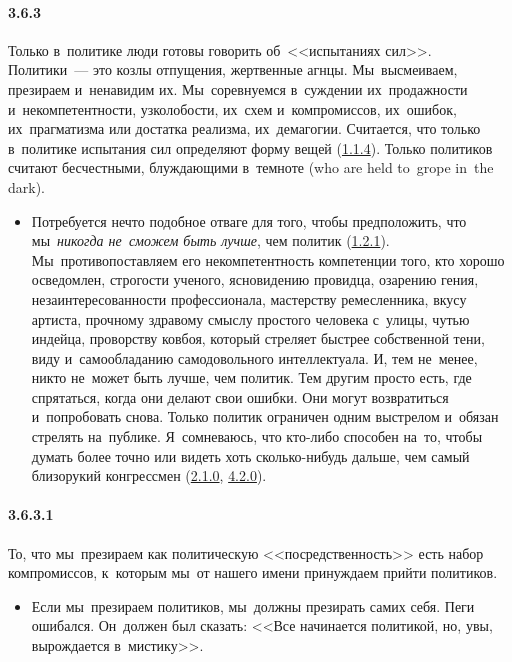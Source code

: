 \paragraph{3.6.3}\hypertarget{par:3.6.3}{} Только в~политике люди готовы говорить об~<<испытаниях сил>>. Политики~--- это козлы отпущения, жертвенные агнцы. Мы~высмеиваем, презираем и~ненавидим их. Мы~соревнуемся в~суждении их~продажности и~некомпетентности, узколобости, их~схем и~компромиссов, их~ошибок, их~прагматизма или достатка реализма, их~демагогии. Считается, что только в~политике испытания сил определяют форму вещей (\hyperlink{par:1.1.4}{1.1.4}). Только политиков считают бесчестными, блуждающими в~темноте (who are held to~grope in~the dark). 
	\begin{itemize}
	\item 
	Потребуется нечто подобное отваге для того, чтобы предположить, что мы~{\itshape никогда не~сможем быть лучше}, чем политик (\hyperlink{par:1.2.1}{1.2.1}). Мы~противопоставляем его некомпетентность компетенции того, кто хорошо осведомлен, строгости ученого, ясновидению провидца, озарению гения, незаинтересованности профессионала, мастерству ремесленника, вкусу артиста, прочному здравому смыслу простого человека с~улицы, чутью индейца, проворству ковбоя, который стреляет быстрее собственной тени, виду и~самообладанию самодовольного интеллектуала. И, тем не~менее, никто не~может быть лучше, чем политик. Тем другим просто есть, где спрятаться, когда они делают свои ошибки. Они могут возвратиться и~попробовать снова. Только политик ограничен одним выстрелом и~обязан стрелять на~публике. Я~сомневаюсь, что кто-либо способен на~то, чтобы думать более точно или видеть хоть сколько-нибудь дальше, чем самый близорукий конгрессмен (\hyperlink{par:2.1.0}{2.1.0}, \hyperlink{par:4.2.0}{4.2.0}).
	\end{itemize}

\paragraph{3.6.3.1}\hypertarget{par:3.6.3.1}{} То, что мы~презираем как политическую <<посредственность>> есть набор компромиссов, к~которым мы~от нашего имени принуждаем прийти политиков.
	\begin{itemize}
	\item 
	Если мы~презираем политиков, мы~должны презирать самих себя. Пеги ошибался. Он~должен был сказать: <<Все начинается политикой, но, увы, вырождается в~мистику>>.
	\end{itemize}

